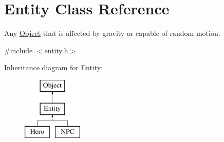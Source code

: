 \hypertarget{class_entity}{\section{Entity Class Reference}
\label{class_entity}
}


Any \hyperlink{class_object}{Object} that is affected by gravity or capable of random motion.  




{\ttfamily \#include $<$entity.\-h$>$}

Inheritance diagram for Entity\-:\begin{figure}[H]
\begin{center}
\leavevmode
\includegraphics[height=3.000000cm]{class_entity}
\end{center}
\end{figure}
